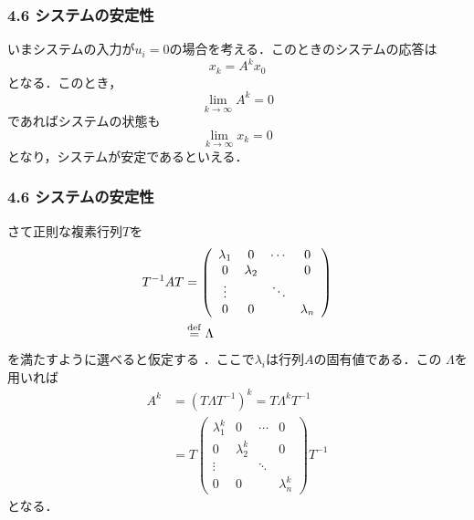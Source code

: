 \begin{frame}[t]
\frametitle{4.6 システムの安定性}
いまシステムの入力が$u_i = 0$の場合を考える．このときのシステムの応答は
\begin{equation}
 x_k = A^k x_0
\end{equation}
となる．このとき，
\begin{equation}
 \lim_{k \rightarrow \infty} A^k = 0
\end{equation}
であればシステムの状態も
\begin{equation}
 \lim_{k \rightarrow \infty} x_k = 0
\end{equation}
となり，システムが安定であるといえる．
\end{frame}

\begin{frame}[t]
\frametitle{4.6 システムの安定性}
さて正則な複素行列$T$を
\begin{align}
 T^{-1} A T
  &=
  \left(\begin{array}{cccc}
         \lambda_1 & 0         & \cdots & 0 \\
	 0         & \lambda_2 &        & 0 \\
	 \vdots    &           & \ddots & \\
	 0         & 0         &        & \lambda_n 
	\end{array}\right) \nonumber \\
 &\stackrel{\rm def}{=} \Lambda
\end{align}
を満たすように選べると仮定する
．ここで$\lambda_i$は行列$A$の固有値である．この
$\Lambda$を用いれば
\begin{align}
 A^k &= (T \Lambda T^{-1})^k = T \Lambda ^k T^{-1} \nonumber \\
 &= T
  \left(\begin{array}{cccc}
         \lambda_1^k & 0           & \cdots & 0 \\
	 0           & \lambda_2^k &        & 0 \\
	 \vdots      &             & \ddots & \\
	 0           & 0           &        & \lambda_n^k
	\end{array}\right)
  T^{-1}
\end{align}
となる．
\end{frame}

